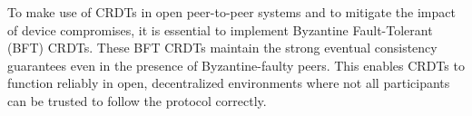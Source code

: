 \documentclass[11pt]{article}
\begin{document}
To make use of CRDTs in open peer-to-peer systems and to mitigate the impact of device compromises, it is essential to implement Byzantine Fault-Tolerant (BFT) CRDTs. These BFT CRDTs maintain the strong eventual consistency guarantees even in the presence of Byzantine-faulty peers. This enables CRDTs to function reliably in open, decentralized environments where not all participants can be trusted to follow the protocol correctly.




\end{document}

